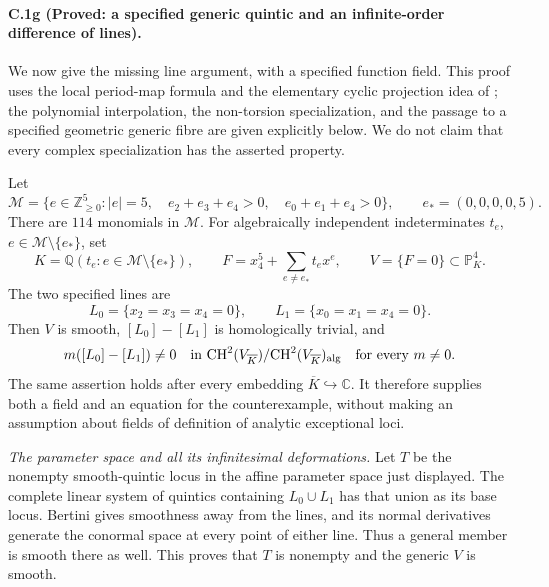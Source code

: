 \paragraph{C.1g (Proved: a specified generic quintic and an infinite-order difference of lines).}
We now give the missing line argument, with a specified function field.
This proof uses the local period-map formula and the elementary cyclic
projection idea of \citet[Section III]{cyCeresaCollino1983}; the polynomial
interpolation, the non-torsion specialization, and the passage to a
specified geometric generic fibre are given explicitly below. We do not
claim that every complex specialization has the asserted property.

Let
\[
 \mathcal M=\{e\in\mathbb Z_{\ge0}^{5}:|e|=5,\quad
                  e_2+e_3+e_4>0,\quad e_0+e_1+e_4>0\},
 \qquad e_*=(0,0,0,0,5).
\]
There are $114$ monomials in $\mathcal M$. For algebraically independent
indeterminates $t_e$, $e\in\mathcal M\setminus\{e_*\}$, set
\[
 K=\mathbb Q(t_e:e\in\mathcal M\setminus\{e_*\}),\qquad
 F=x_4^5+\sum_{e\ne e_*}t_e x^e,
 \qquad V=\{F=0\}\subset\mathbb P^4_K.
\]
The two specified lines are
\[
 L_0=\{x_2=x_3=x_4=0\},\qquad
 L_1=\{x_0=x_1=x_4=0\}.
\]
Then $V$ is smooth, $[L_0]-[L_1]$ is homologically trivial, and
\begin{equation}\label{eq:specified-quintic-lines}
 m([L_0]-[L_1])\ne0
 \quad\hbox{in }\mathrm{CH}^2(V_{\overline K})/
                    \mathrm{CH}^2(V_{\overline K})_{\mathrm{alg}}
 \quad\text{for every }m\ne0.
\end{equation}
The same assertion holds after every embedding $\overline K\hookrightarrow
\mathbb C$. It therefore supplies both a field and an equation for the
counterexample, without making an assumption about fields of definition
of analytic exceptional loci.

\emph{The parameter space and all its infinitesimal deformations.}
Let $T$ be the nonempty smooth-quintic locus in the affine parameter
space just displayed. The complete linear system of quintics containing
$L_0\cup L_1$ has that union as its base locus. Bertini gives smoothness
away from the lines, and its normal derivatives generate the conormal
space at every point of either line. Thus a general member is smooth
there as well. This proves that $T$ is nonempty and the generic $V$ is
smooth.

